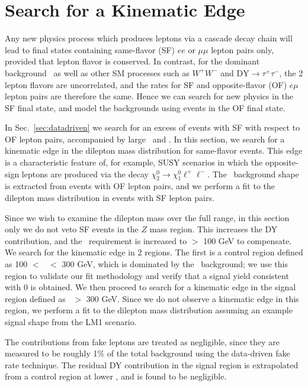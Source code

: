 \section{Search for a Kinematic Edge}
\label{sec:fit}

Any new physics process which produces leptons via a cascade decay chain will lead to final states
containing same-flavor (SF) $ee$ or $\mu\mu$ lepton pairs only, provided that lepton flavor
is conserved. In contrast, for the dominant background \ttbar\ as well as other
SM processes such as $W^+W^-$ and $\mathrm{DY}\to\tau^+\tau^-$, the 2 lepton flavors are uncorrelated,
and the rates for SF and opposite-flavor (OF) $e\mu$ lepton pairs are therefore the same.
Hence we can search for new physics in the SF final state, and model the backgrounds
using events in the OF final state. 

In Sec.~\ref{sec:datadriven} we search for an excess of
events with SF with respect to OF lepton pairs, accompanied by large \met\ and \Ht. 
In this section, we search for a kinematic edge in the dilepton mass distribution for same-flavor
events. This edge is a characteristic feature of, for example, SUSY scenarios in which
the opposite-sign leptons are produced via the decay $\chi_2^0 \to \chi_1^0 \ell^+\ell^-$.
The \ttbar\ background shape is extracted from events with OF lepton pairs, and we perform
a fit to the dilepton mass distribution in events with SF lepton pairs.

Since we wish to examine the dilepton mass over the full range, in this section only we do not
veto SF events in the $Z$ mass region. This increases the DY contribution, and the \MET\ requirement 
is increased to \MET $>$ 100 GeV to compensate.
We search for the kinematic edge in 2 regions.  The first is a control region defined
as 100 $<$ \Ht\ $<$ 300 GeV, which is dominated by the \ttbar\ background; we use 
this region to validate our fit methodology and verify that a signal yield consistent with 0 
is obtained. We then proceed to search for a kinematic edge in the signal region defined as 
\Ht\ $>$ 300 GeV. Since we do not observe a kinematic edge in this region, we perform a 
fit to the dilepton mass distribution assuming an example signal shape from the LM1 scenario.

The contributions from fake leptons are treated as negligible, since they are measured
to be roughly 1\% of the total background using the data-driven fake rate technique.
The residual DY contribution in the signal region is extrapolated from a control region at lower \Ht,
and is found to be negligible.
 
